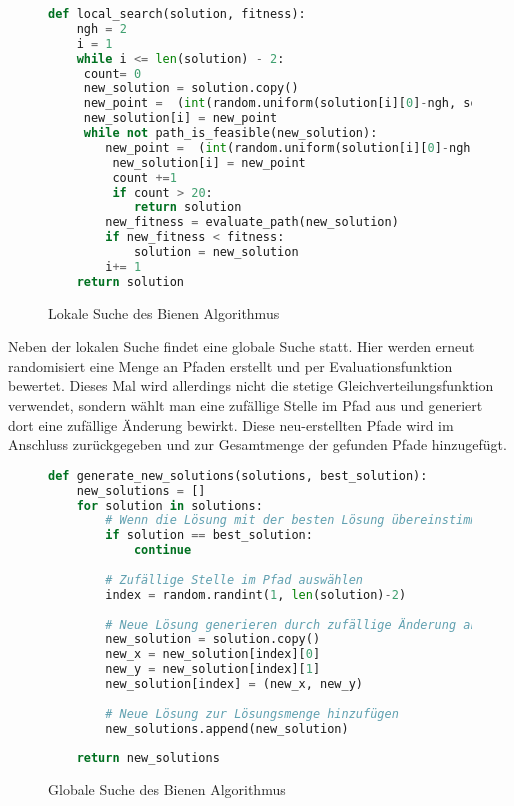 \begin{figure}[H]
    \begin{lstlisting}[language=python]
def local_search(solution, fitness):
    ngh = 2
    i = 1
    while i <= len(solution) - 2:
     count= 0
     new_solution = solution.copy()
     new_point =  (int(random.uniform(solution[i][0]-ngh, solution[i][0]+ngh)),int(random.uniform(solution[i][1]-ngh, solution[i][1]+ngh)))
     new_solution[i] = new_point
     while not path_is_feasible(new_solution):
        new_point =  (int(random.uniform(solution[i][0]-ngh, solution[i][0]+ngh)),int(random.uniform(solution[i][1]-ngh, solution[i][1]+ngh)))
         new_solution[i] = new_point 
         count +=1
         if count > 20:
            return solution
        new_fitness = evaluate_path(new_solution)
        if new_fitness < fitness:
            solution = new_solution
        i+= 1
    return solution
    \end{lstlisting}
    \caption{Lokale Suche des Bienen Algorithmus}
\end{figure}

Neben der lokalen Suche findet eine globale Suche statt. Hier werden erneut randomisiert eine Menge an Pfaden erstellt und per Evaluationsfunktion bewertet. Dieses Mal wird allerdings nicht die stetige Gleichverteilungsfunktion verwendet, sondern wählt man eine zufällige Stelle im Pfad aus und generiert dort eine zufällige Änderung bewirkt. Diese neu-erstellten Pfade wird im Anschluss zurückgegeben und zur Gesamtmenge der gefunden Pfade hinzugefügt.

\begin{figure}[H]
    \begin{lstlisting}[language=python]
def generate_new_solutions(solutions, best_solution):
    new_solutions = []
    for solution in solutions:
        # Wenn die Lösung mit der besten Lösung übereinstimmt, wird sie übersprungen
        if solution == best_solution:
            continue
        
        # Zufällige Stelle im Pfad auswählen
        index = random.randint(1, len(solution)-2)
        
        # Neue Lösung generieren durch zufällige Änderung an der ausgewählten Stelle
        new_solution = solution.copy()
        new_x = new_solution[index][0] 
        new_y = new_solution[index][1] 
        new_solution[index] = (new_x, new_y)
        
        # Neue Lösung zur Lösungsmenge hinzufügen
        new_solutions.append(new_solution)
    
    return new_solutions
    \end{lstlisting}
    \caption{Globale Suche des Bienen Algorithmus}
\end{figure}

